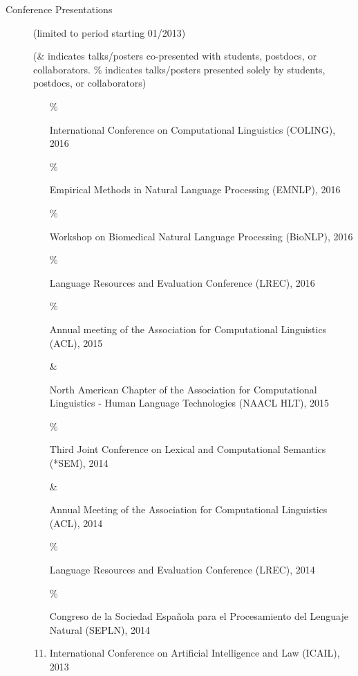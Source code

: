\documentclass[10pt]{article}
\newcommand{\lmt}{(limited to period starting 01/2013)}
\begin{document}
\begin{description}
\item [Conference Presentations] \lmt \

(\& indicates talks/posters co-presented with students, postdocs, or collaborators. \% indicates talks/posters presented solely by students, postdocs, or collaborators)


\begin{enumerate}

\item 
[\% \addtocounter{enumi}{1}\theenumi ]
International Conference on Computational Linguistics (COLING), 2016

\item 
[\% \addtocounter{enumi}{1}\theenumi ]
Empirical Methods in Natural Language Processing (EMNLP), 2016

\item 
[\% \addtocounter{enumi}{1}\theenumi ]
Workshop on Biomedical Natural Language Processing (BioNLP), 2016

\item 
[\% \addtocounter{enumi}{1}\theenumi ]
Language Resources and Evaluation Conference (LREC), 2016

\item 
[\% \addtocounter{enumi}{1}\theenumi ]
Annual meeting of the Association for Computational Linguistics (ACL), 2015

\item 
[\& \addtocounter{enumi}{1}\theenumi ]
North American Chapter of the Association for Computational Linguistics - Human Language Technologies (NAACL HLT), 2015

\item 
[\% \addtocounter{enumi}{1}\theenumi ]
Third Joint Conference on Lexical and Computational Semantics (*SEM), 2014

\item 
[\& \addtocounter{enumi}{1}\theenumi ]
Annual Meeting of the Association for Computational Linguistics (ACL), 2014

\item 
[\% \addtocounter{enumi}{1}\theenumi ]
Language Resources and Evaluation Conference (LREC), 2014

\item 
[\% \addtocounter{enumi}{1}\theenumi ]
Congreso de la Sociedad Espa\~{n}ola para el Procesamiento del Lenguaje Natural (SEPLN), 2014

\item 
International Conference on Artificial Intelligence and Law (ICAIL), 2013


\end{enumerate}
\end{description}
\end{document}
